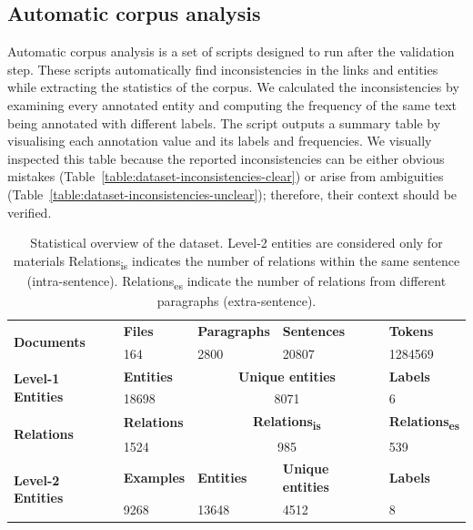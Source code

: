 \subsection{Automatic corpus analysis}
\label{automatic-corpus-analysis}
Automatic corpus analysis is a set of scripts designed to run after the validation step. 
These scripts automatically find inconsistencies in the links and entities while extracting the statistics of the corpus. 
We calculated the inconsistencies by examining every annotated entity and computing the frequency of the same text being annotated with different labels. 
The script outputs a summary table by visualising each annotation value and its labels and frequencies.
We visually inspected this table because the reported inconsistencies can be either obvious mistakes (Table~\ref{table:dataset-inconsistencies-clear}) or arise from ambiguities (Table~\ref{table:dataset-inconsistencies-unclear}); therefore, their context should be verified. 

\begin{table}[htbp]
    \caption{Statistical overview of the dataset. Level-2 entities are considered only for materials
    Relations\textsubscript{is} indicates the number of relations within the same sentence (intra-sentence). Relations\textsubscript{es} indicate the number of relations from different paragraphs (extra-sentence).}
    \begin{tabular}{ m{6em}   m{5em}  m{6em}  m{8em}  m{6em} } 
    \toprule
        \multirow{2}{5em}{\textbf{Documents}} & \textbf{Files} & \textbf{Paragraphs} &	\textbf{Sentences} & \textbf{Tokens}\\
         & 164  &	2800 & 	20807 & 	1284569\\
    \midrule
        \multirow{2}{5em}{\textbf{Level-1 Entities}} & \textbf{Entities} &  \multicolumn{2}{c}{\textbf{Unique entities}} &  \textbf{ Labels} \\
        & 18698 &  \multicolumn{2}{c}{8071} &  6 \\
    \midrule
        \multirow{2}{5em}{\textbf{Relations}} & \textbf{Relations} & \multicolumn{2}{c}{\textbf{Relations\textsubscript{is}}} 
        & \textbf{Relations\textsubscript{es}}\\
        & 1524  & \multicolumn{2}{c}{985} &	539	\\
    \midrule        
        \multirow{2}{5em}{\textbf{Level-2 Entities}} & \textbf{Examples} &  \textbf{Entities} & \textbf{Unique entities} &  \textbf{ Labels} \\
        & 9268 &  13648 & 4512 &  8 \\
    \bottomrule
    \end{tabular}
    \label{table:summary-content}
\end{table}

